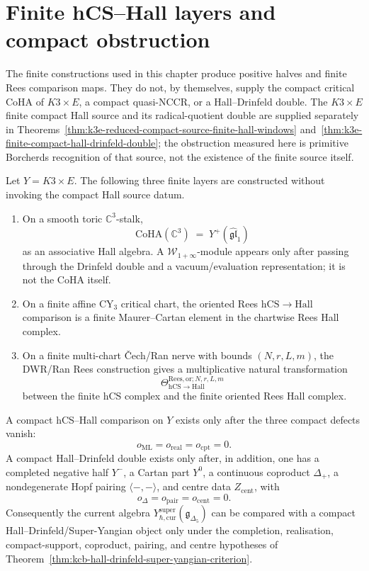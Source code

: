 \section{Finite hCS--Hall layers and compact obstruction}
\label{sec:kcb-k3-convergence}

The finite constructions used in this chapter produce positive halves and
finite Rees comparison maps. They do not, by themselves, supply the compact
critical CoHA of \(K3\times E\), a compact quasi-NCCR, or a Hall--Drinfeld
double. The \(K3\times E\) finite compact Hall source and its
radical-quotient double are supplied separately in
Theorems~\ref{thm:k3e-reduced-compact-source-finite-hall-windows}
and~\ref{thm:k3e-finite-compact-hall-drinfeld-double}; the obstruction
measured here is primitive Borcherds recognition of that source, not
the existence of the finite source itself.

\begin{proposition}
\label{prop:kcb-finite-rees-compact-double-obstruction}
Let \(Y=K3\times E\). The following three finite layers are constructed
without invoking the compact Hall source datum.
\begin{enumerate}[label=\textup{(\roman*)}]
\item On a smooth toric \(\mathbb{C}^3\)-stalk,
\[
 \mathrm{CoHA}(\mathbb{C}^3)
 \;=\;
 Y^+(\widehat{\mathfrak{gl}}_1)
\]
as an associative Hall algebra. A \(\mathcal{W}_{1+\infty}\)-module appears
only after passing through the Drinfeld double and a vacuum/evaluation
representation; it is not the CoHA itself.
\item On a finite affine CY$_3$ critical chart, the oriented Rees
\(\mathrm{hCS}\to\mathrm{Hall}\) comparison is a finite Maurer--Cartan
element in the chartwise Rees Hall complex.
\item On a finite multi-chart \v{C}ech/Ran nerve with bounds
\((N,r,L,m)\), the DWR/Ran Rees construction gives a multiplicative
natural transformation
\[
 \Theta_{\mathrm{hCS}\to\mathrm{Hall}}^{\mathrm{Rees,or};N,r,L,m}
\]
between the finite hCS complex and the finite oriented Rees Hall complex.
\end{enumerate}
A compact hCS--Hall comparison on \(Y\) exists only after the three compact
defects vanish:
\[
 o_{\mathrm{ML}}=o_{\mathrm{real}}=o_{\mathrm{cpt}}=0.
\]
A compact Hall--Drinfeld double exists only after, in addition, one has a
completed negative half \(Y^-\), a Cartan part \(Y^0\), a continuous
coproduct \(\Delta_+\), a nondegenerate Hopf pairing
\(\langle-,-\rangle\), and centre data \(Z_{\mathrm{cent}}\), with
\[
 o_{\Delta}=o_{\mathrm{pair}}=o_{\mathrm{cent}}=0.
\]
Consequently the current algebra
\(Y_{\hbar,\mathrm{cur}}^{\mathrm{super}}(\mathfrak g_{\Delta_5})\)
can be compared with a compact Hall--Drinfeld/Super-Yangian object only
under the completion, realisation, compact-support, coproduct, pairing,
and centre hypotheses of
Theorem~\ref{thm:kcb-hall-drinfeld-super-yangian-criterion}.
\end{proposition}


